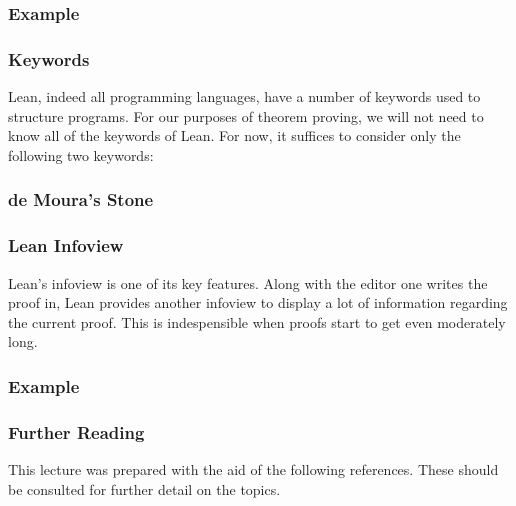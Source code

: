 \documentclass{beamer}
\theoremstyle{indentDefn} \newtheorem{defn}[]{Definition}
\begin{document}
\begin{frame}
\frametitle{Example}



\end{frame}

\begin{frame}
\frametitle{Keywords}

Lean, indeed all programming languages, have a number of keywords used to structure programs. For our purposes of theorem proving, we will not need to know all of the keywords of Lean. For now, it suffices to consider only the following two keywords: 




\end{frame}

\begin{frame}
\frametitle{de Moura's Stone}


\end{frame}


\begin{frame}
\frametitle{Lean Infoview}

Lean's infoview is one of its key features. Along with the editor one writes the proof in, Lean provides another infoview to display a lot of information regarding the current proof. This is indespensible when proofs start to get even moderately long. 


\end{frame}

\begin{frame}
\frametitle{Example}

\end{frame}
\begin{frame}
	\frametitle{Further Reading}
	
    This lecture was prepared with the aid of the following references. 
    These should be consulted for further detail on the topics. 

    \printbibliography
	
\end{frame}
\end{document}
